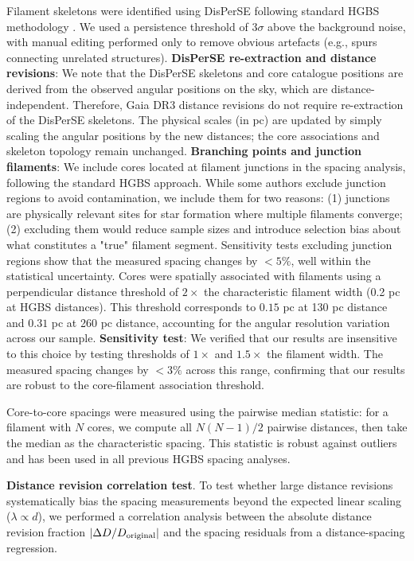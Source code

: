 \documentclass[twoside,twocolumn]{mnras}
\begin{document}
Filament skeletons were identified using DisPerSE \citep{Sousbie2011} following standard HGBS methodology \citep{Arzoumanian2011}. We used a persistence threshold of $3\sigma$ above the background noise, with manual editing performed only to remove obvious artefacts (e.g., spurs connecting unrelated structures). \textbf{DisPerSE re-extraction and distance revisions}: We note that the DisPerSE skeletons and core catalogue positions are derived from the observed angular positions on the sky, which are distance-independent. Therefore, Gaia DR3 distance revisions do not require re-extraction of the DisPerSE skeletons. The physical scales (in pc) are updated by simply scaling the angular positions by the new distances; the core associations and skeleton topology remain unchanged. \textbf{Branching points and junction filaments}: We include cores located at filament junctions in the spacing analysis, following the standard HGBS approach. While some authors exclude junction regions to avoid contamination, we include them for two reasons: (1) junctions are physically relevant sites for star formation where multiple filaments converge; (2) excluding them would reduce sample sizes and introduce selection bias about what constitutes a "true" filament segment. Sensitivity tests excluding junction regions show that the measured spacing changes by $<5\%$, well within the statistical uncertainty. Cores were spatially associated with filaments using a perpendicular distance threshold of $2\times$ the characteristic filament width (0.2 pc at HGBS distances). This threshold corresponds to $0.15$ pc at 130 pc distance and $0.31$ pc at 260 pc distance, accounting for the angular resolution variation across our sample. \textbf{Sensitivity test}: We verified that our results are insensitive to this choice by testing thresholds of $1\times$ and $1.5\times$ the filament width. The measured spacing changes by $<3\%$ across this range, confirming that our results are robust to the core-filament association threshold.

Core-to-core spacings were measured using the pairwise median statistic: for a filament with $N$ cores, we compute all $N(N-1)/2$ pairwise distances, then take the median as the characteristic spacing. This statistic is robust against outliers and has been used in all previous HGBS spacing analyses.

\textbf{Distance revision correlation test}. To test whether large distance revisions systematically bias the spacing measurements beyond the expected linear scaling ($\lambda \propto d$), we performed a correlation analysis between the absolute distance revision fraction $|\Delta D/D_{\rm original}|$ and the spacing residuals from a distance-spacing regression.
\end{document}
